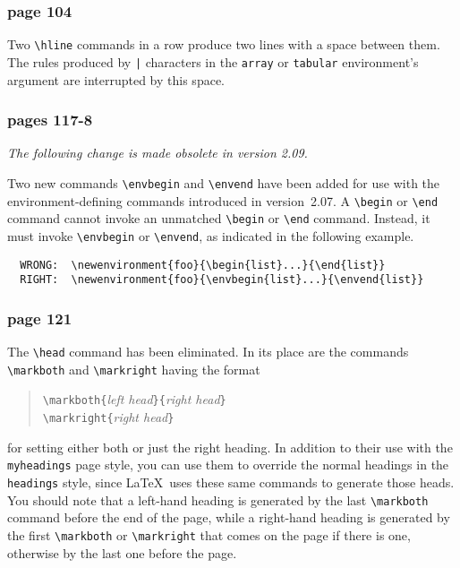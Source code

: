 \subsubsection*{page 104}

Two \hbox{\verb|\hline|} commands in a row produce two lines with
a space between them.  The rules produced by \hbox{\tt |} characters
in the \hbox{\tt array} or \hbox{\tt tabular} environment's argument
are interrupted by this space.

\subsubsection* {pages 117-8}

{\it The following change is made obsolete in version 2.09.}

Two new commands \hbox{\verb"\envbegin"} and \hbox{\verb"\envend"}
have been added for use with the environment-defining commands
introduced in version~2.07.  A \hbox{\verb"\begin"} or \hbox{\verb"\end"}
command cannot invoke an unmatched \hbox{\verb"\begin"} or \hbox{\verb"\end"}
command.  Instead, it must invoke \hbox{\verb"\envbegin"} or
\hbox{\verb"\envend"}, as indicated in the following example.
\begin{verbatim}
  WRONG:  \newenvironment{foo}{\begin{list}...}{\end{list}}
  RIGHT:  \newenvironment{foo}{\envbegin{list}...}{\envend{list}}
\end{verbatim}

\subsubsection* {page 121}

The \hbox{\verb|\head|} command has been eliminated.
In its place are the commands \hbox{\verb|\markboth|} 
and \hbox{\verb|\markright|}
having the format
\begin{quote}
\verb|\markboth{|{\it left head\/}\verb|}{|{\it right head\/}\verb|}|\\
\verb|\markright{|{\it right head\/}\verb|}|
\end{quote}
for setting either both or just the right heading.  In addition to
their use with the \hbox{\tt myheadings} page style, you can use them
to override the normal headings in the \hbox{\tt headings} style,
since \LaTeX\ uses these same commands to generate those heads.  You
should note that a left-hand heading is generated by the last
\hbox{\verb|\markboth|} command before the end of the page, while a
right-hand heading is generated by the first \hbox{\verb|\markboth|}
or \hbox{\verb|\markright|} that comes on the page if there is one,
otherwise by the last one before the page.


